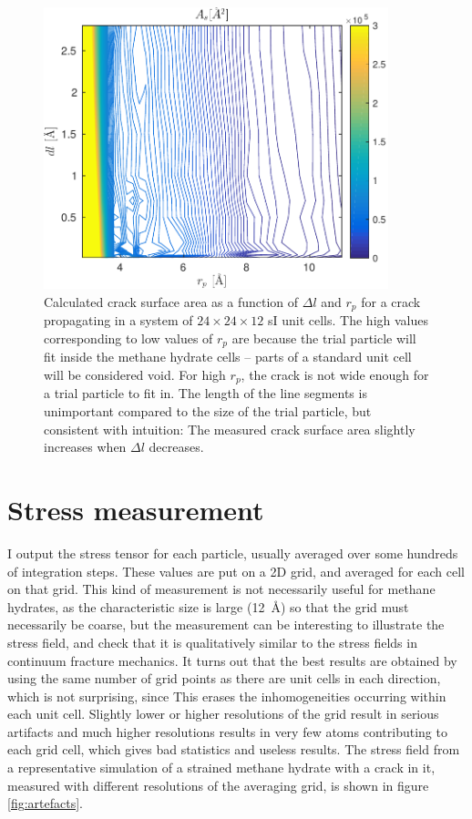 \begin{figure}
\centering
\includegraphics[width=10cm]{../figures/thesis/crack_tracer_test.pdf}
\caption{Calculated crack surface area as a function of $\Delta l$ and $r_p$ for a crack propagating in a system of $24\times 24 \times 12$ sI unit cells. The high values corresponding to low values of $r_p$ are because the trial particle will fit inside the methane hydrate cells -- parts of a standard unit cell will be considered void. For high $r_p$, the crack is not wide enough for a trial particle to fit in. The length of the line segments is unimportant compared to the size of the trial particle, but consistent with intuition: The measured crack surface area slightly increases when $\Delta l$ decreases.}
\label{fig:crack_trace_test}
\end{figure}


\section{Stress measurement}
I output the stress tensor for each particle, usually averaged over some hundreds of integration steps. These values are put on a 2D grid, and averaged for each cell on that grid. This kind of measurement is not necessarily useful for methane hydrates, as the characteristic size is large (\SI{12}{\angstrom}) so that the grid must necessarily be coarse, but the measurement can be interesting to illustrate the stress field, and check that it is qualitatively similar to the stress fields in continuum fracture mechanics. It turns out that the best results are obtained by using the same number of grid points as there are unit cells in each direction, which is not surprising, since This erases the inhomogeneities occurring within each unit cell. Slightly lower or higher resolutions of the grid result in serious artifacts and much higher resolutions results in very few atoms contributing to each grid cell, which gives bad statistics and useless results. The stress field from a representative simulation of a strained methane hydrate with a crack in it, measured with different resolutions of the averaging grid, is shown in figure \ref{fig:artefacts}.


